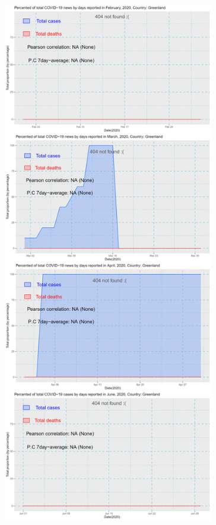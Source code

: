 \documentclass[a4paper]{article}
\theoremstyle{definition}
\begin{document}
\begin{enumerate}[i)]
\begin{enumerate}[1)]
\begin{figure}[H]
				\includegraphics[height=23cm,width=13cm]{images/9.3.png}
			\end{figure}
			\begin{figure}[H]
				\centering

\end{figure}
\end{enumerate}
\end{enumerate}
\end{document}
